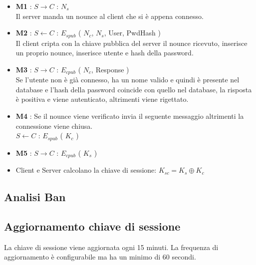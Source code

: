 \documentclass[a4paper,titlepage]{article}
\begin{document}
\begin{itemize}
\item \textbf{M1} : $S \rightarrow C$ : $N_s$ \\
Il server manda un nounce al client che si è appena connesso.
\item \textbf{M2} : $S \leftarrow C$ : $E_{spub}$ ( $N_c$, $N_s$, User, PwdHash )\\
Il client cripta con la chiave pubblica del server il nounce ricevuto, inserisce un proprio nounce, inserisce utente e hash della password.
\item \textbf{M3} : $S \rightarrow C$ : $E_{cpub}$ ( $N_c$, Response )\\
Se l'utente non è già connesso, ha un nome valido e quindi è presente nel database e l'hash della password coincide con quello nel database, la risposta è positiva e viene autenticato, altrimenti viene rigettato.
\item \textbf{M4} : Se il nounce viene verificato invia il seguente messaggio altrimenti la connessione viene chiusa.\\
$S \leftarrow C$ : $E_{spub}$ ( $K_c$ )
\item \textbf{M5} : $S \rightarrow C$ : $E_{cpub}$ ( $K_s$ )
\item Client e Server calcolano la chiave di sessione: $ K_{sc} = K_s \oplus K_c $
\end{itemize}

\subsection{Analisi Ban}


\subsection{Aggiornamento chiave di sessione}
La chiave di sessione viene aggiornata ogni 15 minuti. La frequenza di aggiornamento è configurabile ma ha un minimo di 60 secondi. 
\end{document}
